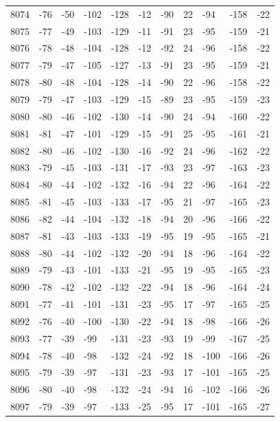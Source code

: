 \begin{table}[H]
\begin{tabular}{lllllllllll}
8074 & -76 & -50 & -102 & -128 & -12 & -90 & 22 & -94 & -158 & -22 \\
8075 & -77 & -49 & -103 & -129 & -11 & -91 & 23 & -95 & -159 & -21 \\
8076 & -78 & -48 & -104 & -128 & -12 & -92 & 24 & -96 & -158 & -22 \\
8077 & -79 & -47 & -105 & -127 & -13 & -91 & 23 & -95 & -159 & -21 \\
8078 & -80 & -48 & -104 & -128 & -14 & -90 & 22 & -96 & -158 & -22 \\
8079 & -79 & -47 & -103 & -129 & -15 & -89 & 23 & -95 & -159 & -23 \\
8080 & -80 & -46 & -102 & -130 & -14 & -90 & 24 & -94 & -160 & -22 \\
8081 & -81 & -47 & -101 & -129 & -15 & -91 & 25 & -95 & -161 & -21 \\
8082 & -80 & -46 & -102 & -130 & -16 & -92 & 24 & -96 & -162 & -22 \\
8083 & -79 & -45 & -103 & -131 & -17 & -93 & 23 & -97 & -163 & -23 \\
8084 & -80 & -44 & -102 & -132 & -16 & -94 & 22 & -96 & -164 & -22 \\
8085 & -81 & -45 & -103 & -133 & -17 & -95 & 21 & -97 & -165 & -23 \\
8086 & -82 & -44 & -104 & -132 & -18 & -94 & 20 & -96 & -166 & -22 \\
8087 & -81 & -43 & -103 & -133 & -19 & -95 & 19 & -95 & -165 & -21 \\
8088 & -80 & -44 & -102 & -132 & -20 & -94 & 18 & -96 & -164 & -22 \\
8089 & -79 & -43 & -101 & -133 & -21 & -95 & 19 & -95 & -165 & -23 \\
8090 & -78 & -42 & -102 & -132 & -22 & -94 & 18 & -96 & -164 & -24 \\
8091 & -77 & -41 & -101 & -131 & -23 & -95 & 17 & -97 & -165 & -25 \\
8092 & -76 & -40 & -100 & -130 & -22 & -94 & 18 & -98 & -166 & -26 \\
8093 & -77 & -39 & -99 & -131 & -23 & -93 & 19 & -99 & -167 & -25 \\
8094 & -78 & -40 & -98 & -132 & -24 & -92 & 18 & -100 & -166 & -26 \\
8095 & -79 & -39 & -97 & -131 & -23 & -93 & 17 & -101 & -165 & -25 \\
8096 & -80 & -40 & -98 & -132 & -24 & -94 & 16 & -102 & -166 & -26 \\
8097 & -79 & -39 & -97 & -133 & -25 & -95 & 17 & -101 & -165 & -27 \\

\end{tabular}
\end{table}
